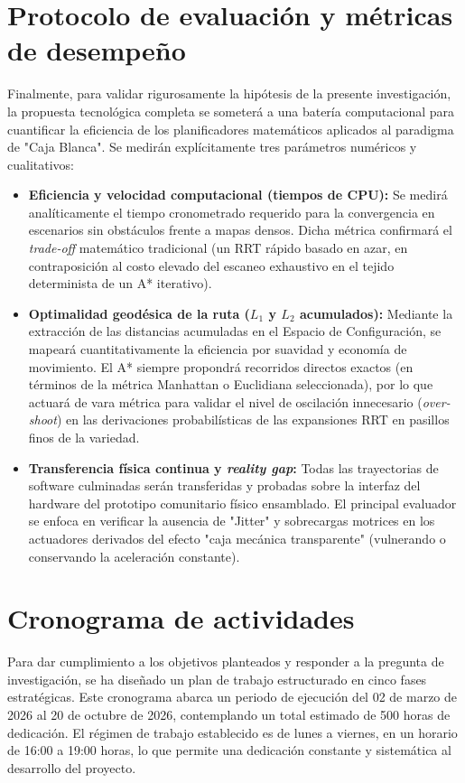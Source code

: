 \section{Protocolo de evaluación y métricas de desempeño}
Finalmente, para validar rigurosamente la hipótesis de la presente investigación, la propuesta tecnológica completa se someterá a una batería computacional para cuantificar la eficiencia de los planificadores matemáticos aplicados al paradigma de "Caja Blanca". Se medirán explícitamente tres parámetros numéricos y cualitativos:
\begin{itemize}
    \item \textbf{Eficiencia y velocidad computacional (tiempos de CPU):} Se medirá analíticamente el tiempo cronometrado requerido para la convergencia en escenarios sin obstáculos frente a mapas densos. Dicha métrica confirmará el \textit{trade-off} matemático tradicional (un RRT rápido basado en azar, en contraposición al costo elevado del escaneo exhaustivo en el tejido determinista de un A* iterativo).
    \item \textbf{Optimalidad geodésica de la ruta ($L_1$ y $L_2$ acumulados):} Mediante la extracción de las distancias acumuladas en el Espacio de Configuración, se mapeará cuantitativamente la eficiencia por suavidad y economía de movimiento. El A* siempre propondrá recorridos directos exactos (en términos de la métrica Manhattan o Euclidiana seleccionada), por lo que actuará de vara métrica para validar el nivel de oscilación innecesario (\textit{over-shoot}) en las derivaciones probabilísticas de las expansiones RRT en pasillos finos de la variedad.
    \item \textbf{Transferencia física continua y \textit{reality gap}:} Todas las trayectorias de software culminadas serán transferidas y probadas sobre la interfaz del hardware del prototipo comunitario físico ensamblado. El principal evaluador se enfoca en verificar la ausencia de "Jitter" y sobrecargas motrices en los actuadores derivados del efecto "caja mecánica transparente" (vulnerando o conservando la aceleración constante).
\end{itemize}

\section{Cronograma de actividades}
Para dar cumplimiento a los objetivos planteados y responder a 
la pregunta de investigación, se ha diseñado un plan de trabajo 
estructurado en cinco fases estratégicas. Este cronograma abarca un 
periodo de ejecución del 02 de marzo de 2026 al 20 de octubre de 2026, 
contemplando un total estimado de 500 horas de dedicación. El régimen de 
trabajo establecido es de lunes a viernes, en un horario de 16:00 a 19:00 horas, 
lo que permite una dedicación constante y sistemática al desarrollo del proyecto.

